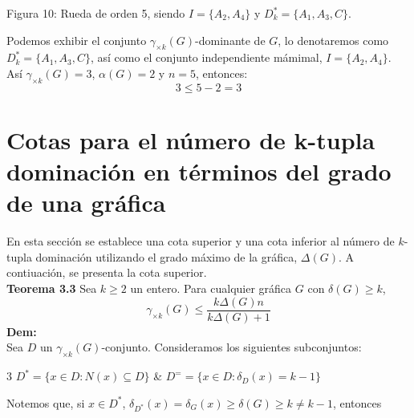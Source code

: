 \documentclass{article}
\begin{document}
\begin{center}

\vspace{0.5cm}

Figura 10: \small{Rueda de orden 5, siendo $I=\{A_2,A_4\}$ y $D_k^*=\{A_1, A_3, C\}$.}


\end{center}
Podemos exhibir el conjunto $\gamma_{\times k}(G)$-dominante de $G$, lo denotaremos como $D_k^*=\{A_1, A_3, C\}$, así como el conjunto independiente mámimal, $I=\{A_2, A_4\}$. Así $\gamma_{\times k}(G)=3$, $\alpha(G)=2$ y $n=5$, entonces:
$$3\leq 5-2=3$$

\newpage

\section{Cotas para el número de k-tupla dominación en términos del grado de una gráfica}


En esta sección se establece una cota superior y una cota inferior al número de $k$-tupla dominación utilizando el grado máximo de la gráfica, $\Delta(G)$. A contiuación, se presenta la cota superior.\\

\textbf{Teorema 3.3} Sea $k\geq 2$ un entero. Para cualquier gráfica $G$ con $\delta(G)\geq k$,\\
$$\gamma_{\times k}(G)\leq \frac{k\Delta(G)n}{k\Delta(G)+1}$$
\textbf{Dem:}\\
Sea $D$ un $\gamma_{\times k}(G)$-conjunto. Consideramos los siguientes subconjuntos:\\

\begin{multicols}{3}
$D^*=\{x\in D:N(x)\subseteq D\}$ 
\columnbreak
\hspace{1 cm} \& \hspace{1 cm}
\columnbreak
$D^==\{x\in D:\delta_D(x)=k-1\}$
\end{multicols}
Notemos que, si $x\in D^*$, $\delta_{D^*}(x)=\delta_G(x)\geq \delta(G)\geq k \neq k-1$, entonces
\end{document}
